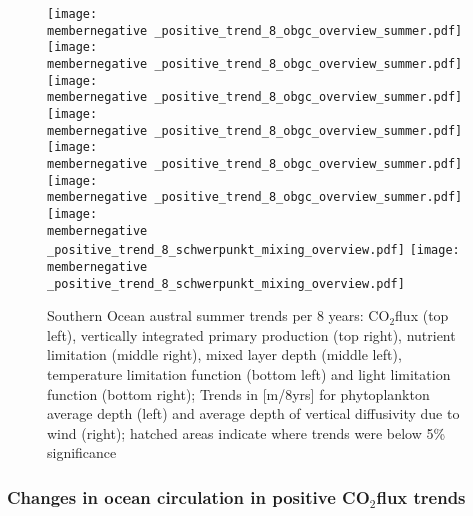 \documentclass[12pt]{article}
\newcommand{\membernegative}{m143_1995_2002}
\begin{document}
\begin{figure}[h!]
	\texttt{[image: \\membernegative \_positive\_trend\_8\_obgc\_overview\_summer.pdf]} %
	\texttt{[image: \\membernegative \_positive\_trend\_8\_obgc\_overview\_summer.pdf]} %
	\texttt{[image: \\membernegative \_positive\_trend\_8\_obgc\_overview\_summer.pdf]} %
	\texttt{[image: \\membernegative \_positive\_trend\_8\_obgc\_overview\_summer.pdf]} %
	\texttt{[image: \\membernegative \_positive\_trend\_8\_obgc\_overview\_summer.pdf]} %
	\texttt{[image: \\membernegative \_positive\_trend\_8\_obgc\_overview\_summer.pdf]} %
	\texttt{[image: \\membernegative \_positive\_trend\_8\_schwerpunkt\_mixing\_overview.pdf]} %
	\hspace{3.5cm}
	\texttt{[image: \\membernegative \_positive\_trend\_8\_schwerpunkt\_mixing\_overview.pdf]} %
	\caption{Southern Ocean austral summer trends per 8 years: CO$_2$flux (top left), vertically integrated primary production (top right), nutrient limitation (middle right), mixed layer depth (middle left), temperature limitation function (bottom left) and light limitation function (bottom right); Trends in [m/8yrs] for phytoplankton average depth (left) and average depth of vertical diffusivity due to wind (right); hatched areas indicate where trends were below 5\% significance}
\label{fig:co2flux_intpp_pos}
\end{figure}





\clearpage

\subsubsection{Changes in ocean circulation in positive CO$_2$flux trends}
\end{document}
